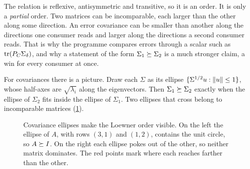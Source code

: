 The relation is reflexive, antisymmetric and transitive, so it is an order. It
is only a \emph{partial} order. Two matrices can be incomparable, each larger
than the other along some direction. An error covariance can be smaller than
another along the directions one consumer reads and larger along the
directions a second consumer reads. That is why the programme compares errors
through a scalar such as $\operatorname{tr}(P_C\Sigma_\delta)$, and why a statement of the form
$\Sigma_1\succeq\Sigma_2$ is a much stronger claim, a win for every consumer at
once.

For covariances there is a picture. Draw each $\Sigma$ as its ellipse
$\{\Sigma^{1/2}u:\lVert u\rVert\le1\}$, whose half-axes are $\sqrt{\lambda_i}$ along the
eigenvectors. Then $\Sigma_1\succeq\Sigma_2$ exactly when the ellipse of
$\Sigma_2$ fits inside the ellipse of $\Sigma_1$. Two ellipses that cross
belong to incomparable matrices (\cref{fig:ch01:loewner}).

\begin{figure}[tbp]
\centering
{}
\caption{Covariance ellipses make the Loewner order visible. On the left the
ellipse of $A$, with rows $(3,1)$ and $(1,2)$, contains the unit circle, so
$A\succeq I$. On the right each ellipse pokes out of the other, so neither matrix
dominates. The red points mark where each reaches farther than the other.}
\label{fig:ch01:loewner}
\end{figure}

